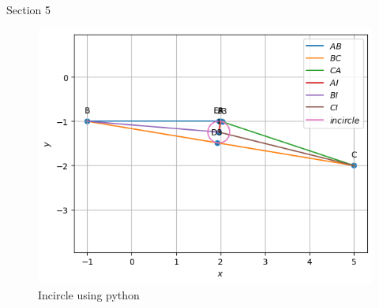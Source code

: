 \begin{table}[H]
    \centering
    
    \caption{Section 5}
    \label{tab:Section5}
\end{table}
\begin{figure}[H]
\includegraphics[width=\columnwidth]{section5/figs/section5.png}
\caption{Incircle using python}
\label{fig:incircle_plot}
\end{figure}